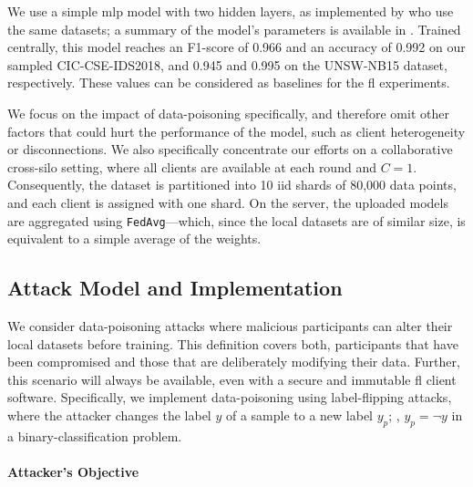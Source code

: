 We use a simple \gls{mlp} model with two hidden layers, as implemented by \textcite{popoola_FederatedDeepLearning_2021} who use the same datasets; a summary of the model's parameters is available in .
Trained centrally, this model reaches an F1-score of 0.966 and an accuracy of 0.992 on our sampled CIC-CSE-IDS2018, and 0.945 and 0.995 on the UNSW-NB15 dataset, respectively.
These values can be considered as baselines for the \gls{fl} experiments.

We focus on the impact of data-poisoning specifically, and therefore omit other factors that could hurt the performance of the model, such as client heterogeneity or disconnections.
We also specifically concentrate our efforts on a collaborative cross-silo setting, where all clients are available at each round and $C=1$.
Consequently, the dataset is partitioned into 10 \gls{iid} shards of 80,000 data points, and each client is assigned with one shard.
On the server, the uploaded models are aggregated using \texttt{FedAvg}---which, since the local datasets are of similar size, is equivalent to a simple average of the weights.

\subsection{Attack Model and Implementation\label{sec:assess.method.poisoning}}

We consider data-poisoning attacks where malicious participants can alter their local datasets before training.
This definition covers both, participants that have been compromised and those that are deliberately modifying their data.
Further, this scenario will always be available, even with a secure and immutable \gls{fl} client software.
Specifically, we implement data-poisoning using label-flipping attacks, where the attacker changes the label $y$ of a sample to a new label $y_p$; \ie, $y_p = \neg y$ in a binary-classification problem.

\paragraph{Attacker's Objective}

